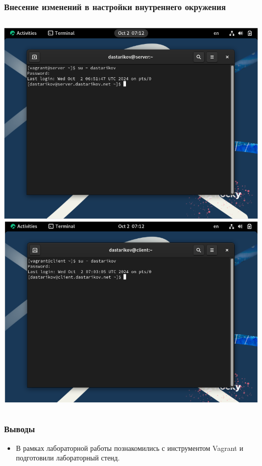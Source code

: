 \begin{frame}
\frametitle{Внесение изменений в настройки внутреннего окружения}
\begin{columns}
        \centering
        \includegraphics[width=\textwidth]{../images/img13.png}
        \centering
        \includegraphics[width=\textwidth]{../images/img14.png}
\end{columns}
\end{frame}

\begin{frame}
\frametitle{Выводы}
\begin{itemize}
    \item В рамках лабораторной работы познакомились с инструментом Vagrant и подготовили лабораторный стенд.
\end{itemize}
\end{frame}

